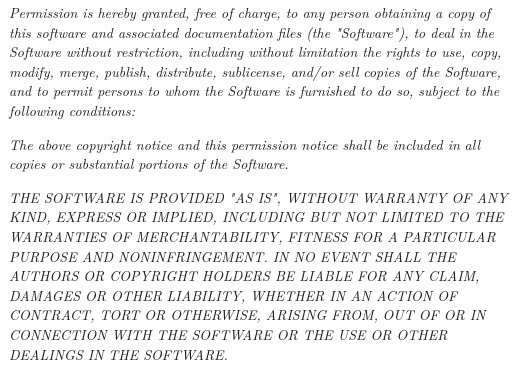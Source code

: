 \begin{anexosenv}
\emph{Permission is hereby granted, free of charge, to any person obtaining a copy}
\emph{of this software and associated documentation files (the "Software"), to deal}
\emph{in the Software without restriction, including without limitation the rights}
\emph{to use, copy, modify, merge, publish, distribute, sublicense, and/or sell}
\emph{copies of the Software, and to permit persons to whom the Software is}
\emph{furnished to do so, subject to the following conditions:}

\emph{The above copyright notice and this permission notice shall be included in}
\emph{all copies or substantial portions of the Software.}

\emph{THE SOFTWARE IS PROVIDED "AS IS", WITHOUT WARRANTY OF ANY KIND, EXPRESS OR}
\emph{IMPLIED, INCLUDING BUT NOT LIMITED TO THE WARRANTIES OF MERCHANTABILITY,}
\emph{FITNESS FOR A PARTICULAR PURPOSE AND NONINFRINGEMENT. IN NO EVENT SHALL THE}
\emph{AUTHORS OR COPYRIGHT HOLDERS BE LIABLE FOR ANY CLAIM, DAMAGES OR OTHER}
\emph{LIABILITY, WHETHER IN AN ACTION OF CONTRACT, TORT OR OTHERWISE, ARISING FROM,}
\emph{OUT OF OR IN CONNECTION WITH THE SOFTWARE OR THE USE OR OTHER DEALINGS IN}
\emph{THE SOFTWARE.}

\end{anexosenv}


\printindex



